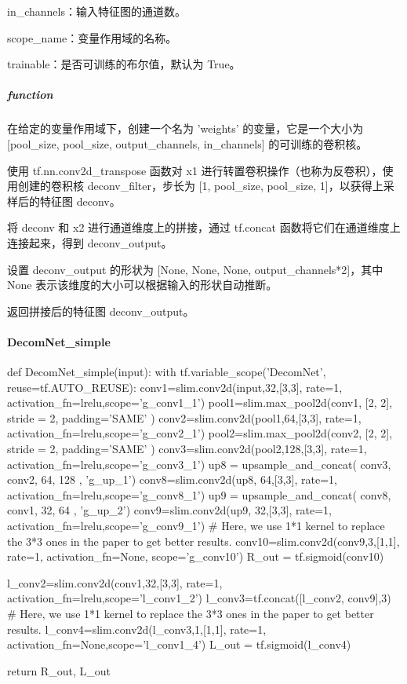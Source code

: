 \documentclass[letterpaper,12pt]{article}
\begin{document}
			in\_channels：输入特征图的通道数。
			
			scope\_name：变量作用域的名称。
			
			trainable：是否可训练的布尔值，默认为 True。
		
		\subparagraph{function}
		
		在给定的变量作用域下，创建一个名为 'weights' 的变量，它是一个大小为 [pool\_size, pool\_size, output\_channels, in\_channels] 的可训练的卷积核。
		
		使用 tf.nn.conv2d\_transpose 函数对 x1 进行转置卷积操作（也称为反卷积），使用创建的卷积核 deconv\_filter，步长为 [1, pool\_size, pool\_size, 1]，以获得上采样后的特征图 deconv。
		
		将 deconv 和 x2 进行通道维度上的拼接，通过 tf.concat 函数将它们在通道维度上连接起来，得到 deconv\_output。
		
		设置 deconv\_output 的形状为 [None, None, None, output\_channels*2]，其中 None 表示该维度的大小可以根据输入的形状自动推断。
		
		返回拼接后的特征图 deconv\_output。	
		
		\paragraph{DecomNet\_simple}
		
		\begin{python}
		def DecomNet_simple(input):
			with tf.variable_scope('DecomNet', reuse=tf.AUTO_REUSE):
				conv1=slim.conv2d(input,32,[3,3], rate=1, activation_fn=lrelu,scope='g_conv1_1')
				pool1=slim.max_pool2d(conv1, [2, 2], stride = 2, padding='SAME' )
				conv2=slim.conv2d(pool1,64,[3,3], rate=1, activation_fn=lrelu,scope='g_conv2_1')
				pool2=slim.max_pool2d(conv2, [2, 2], stride = 2, padding='SAME' )
				conv3=slim.conv2d(pool2,128,[3,3], rate=1, activation_fn=lrelu,scope='g_conv3_1')
				up8 =  upsample_and_concat( conv3, conv2, 64, 128 , 'g_up_1')
				conv8=slim.conv2d(up8,  64,[3,3], rate=1, activation_fn=lrelu,scope='g_conv8_1')
				up9 =  upsample_and_concat( conv8, conv1, 32, 64 , 'g_up_2')
				conv9=slim.conv2d(up9,  32,[3,3], rate=1, activation_fn=lrelu,scope='g_conv9_1')
				# Here, we use 1*1 kernel to replace the 3*3 ones in the paper to get better results.
				conv10=slim.conv2d(conv9,3,[1,1], rate=1, activation_fn=None, scope='g_conv10')
				R_out = tf.sigmoid(conv10)
				
				l_conv2=slim.conv2d(conv1,32,[3,3], rate=1, activation_fn=lrelu,scope='l_conv1_2')
				l_conv3=tf.concat([l_conv2, conv9],3)
				# Here, we use 1*1 kernel to replace the 3*3 ones in the paper to get better results.
				l_conv4=slim.conv2d(l_conv3,1,[1,1], rate=1, activation_fn=None,scope='l_conv1_4')
				L_out = tf.sigmoid(l_conv4)
				
				return R_out, L_out
		\end{python}
	
\end{document}
